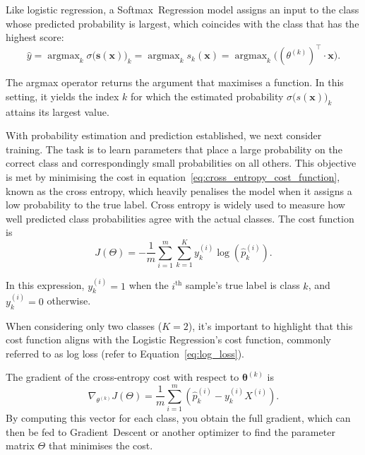 \documentclass[12pt,letter]{article}
\begin{document}
Like logistic regression, a Softmax~Regression model assigns an input to the class whose predicted probability is largest, which coincides with the class that has the highest score:
\begin{equation}
\hat{y} = \mathop{\text{argmax}}_{k} \sigma \big(\textbf{s}(\textbf{x})\big)_k = \mathop{\text{argmax}}_{k} s_k(\textbf{x}) = \mathop{\text{argmax}}_{k} \big( (\theta^{(k)})^{\top} \cdot \textbf{x} \big).
\end{equation}


\begin{mdframed}[middlelinewidth=0.5mm]
\begin{center}
\end{center}
The argmax operator returns the argument that maximises a function. In this setting, it yields the index $k$ for which the estimated probability $\sigma \bigl(s(\mathbf{x})\bigr)_k$ attains its largest value.
\end{mdframed}



With probability estimation and prediction established, we next consider training. The task is to learn parameters that place a large probability on the correct class and correspondingly small probabilities on all others. This objective is met by minimising the cost in equation~\ref{eq:cross_entropy_cost_function}, known as the cross entropy, which heavily penalises the model when it assigns a low probability to the true label. Cross entropy is widely used to measure how well predicted class probabilities agree with the actual classes. The cost function is
\begin{equation}
J(\Theta) = -\frac{1}{m} \sum_{i=1}^{m} \sum_{k=1}^{K} y_k^{(i)} \log (\hat{p}_k^{(i)}).
\label{eq:cross_entropy_cost_function}
\end{equation}

\begin{mdframed}[middlelinewidth=0.5mm]
\begin{center}
\end{center}
In this expression, $y_k^{(i)} = 1$ when the $i^\text{th}$ sample's true label is class $k$, and $y_k^{(i)} = 0$ otherwise.
\end{mdframed}
When considering only two classes ($K = 2$), it's important to highlight that this cost function aligns with the Logistic Regression's cost function, commonly referred to as log loss (refer to Equation~\ref{eq:log_loss}).

The gradient of the cross-entropy cost with respect to $\boldsymbol{\theta}^{(k)}$ is
\begin{equation}
\nabla_{\theta^{(k)}}J(\Theta) = \frac{1}{m} \sum_{i=1}^{m} (\hat{p}_k^{(i)}-y_k^{(i)} X^{(i)}).
\end{equation}
By computing this vector for each class, you obtain the full gradient, which can then be fed to Gradient~Descent or another optimizer to find the parameter matrix $\Theta$ that minimises the cost.
\end{document}
